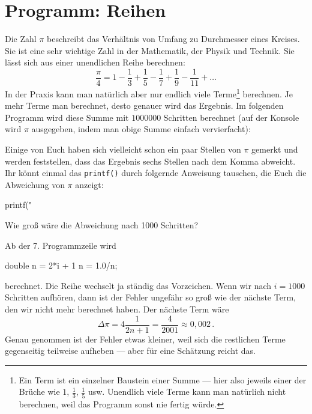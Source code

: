 \section{Programm: Reihen}
\label{sec:c:reihen}

Die Zahl $\pi$ beschreibt das Verhältnis von Umfang zu Durchmesser eines Kreises. Sie ist eine sehr wichtige Zahl in der Mathematik, der Physik und Technik. Sie lässt sich aus einer unendlichen Reihe berechnen:
\begin{equation*}
  \frac{\pi}{4} = 1 - \frac{1}{3} + \frac{1}{5} - \frac{1}{7} + \frac{1}{9} - \frac{1}{11} + \ldots
\end{equation*}
In der Praxis kann man natürlich aber nur endlich viele Terme\footnote{%
  Ein Term ist ein einzelner Baustein einer Summe — hier also jeweils einer der Brüche wie $1$, $\frac{1}{3}$, $\frac{1}{5}$ usw. Unendlich viele Terme kann man natürlich nicht berechnen, weil das Programm sonst nie fertig würde.}
berechnen. Je mehr Terme man berechnet, desto genauer wird das Ergebnis. Im folgenden Programm wird diese Summe mit $1000000$ Schritten berechnet (auf der Konsole wird $\pi$ ausgegeben, indem man obige Summe einfach vervierfacht):


\begin{exercise}
  Einige von Euch haben sich vielleicht schon ein paar Stellen von $\pi$ gemerkt und werden feststellen, dass das Ergebnis sechs Stellen nach dem Komma abweicht. Ihr könnt einmal das \texttt{printf()} durch folgernde Anweisung tauschen, die Euch die Abweichung von $\pi$ anzeigt:
\begin{code}
printf("%
\end{code}
  Wie groß wäre die Abweichung nach 1000 Schritten?
  \begin{solution}
    Ab der 7. Programmzeile wird
\begin{code}
double n = 2*i + 1  
n = 1.0/n;
\end{code}
  berechnet. Die Reihe wechselt ja ständig das Vorzeichen. Wenn wir nach $i=1000$ Schritten aufhören, dann ist der Fehler ungefähr so groß wie der nächste Term, den wir nicht mehr berechnet haben. Der nächste Term wäre 
\begin{equation*}
  \Delta\pi = 4\frac{1}{2 n + 1} = \frac{4}{2001} \approx 0,002\,.
\end{equation*}
  Genau genommen ist der Fehler etwas kleiner, weil sich die restlichen Terme gegenseitig teilweise aufheben — aber für eine Schätzung reicht das.
  \end{solution}
\end{exercise}

